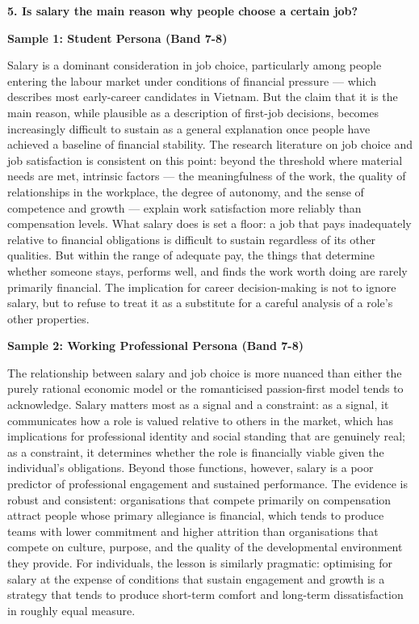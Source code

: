 \separator

\begin{ieltsquestion}
\textbf{5. Is salary the main reason why people choose a certain job?}
\end{ieltsquestion}
\textbf{Sample 1: Student Persona (Band 7-8)}

Salary is a dominant consideration in job choice, particularly among people entering the labour market under conditions of financial pressure — which describes most early-career candidates in Vietnam. But the claim that it is the main reason, while plausible as a description of first-job decisions, becomes increasingly difficult to sustain as a general explanation once people have achieved a baseline of financial stability. The research literature on job choice and job satisfaction is consistent on this point: beyond the threshold where material needs are met, intrinsic factors — the meaningfulness of the work, the quality of relationships in the workplace, the degree of autonomy, and the sense of competence and growth — explain work satisfaction more reliably than compensation levels. What salary does is set a floor: a job that pays inadequately relative to financial obligations is difficult to sustain regardless of its other qualities. But within the range of adequate pay, the things that determine whether someone stays, performs well, and finds the work worth doing are rarely primarily financial. The implication for career decision-making is not to ignore salary, but to refuse to treat it as a substitute for a careful analysis of a role's other properties.

\textbf{Sample 2: Working Professional Persona (Band 7-8)}

The relationship between salary and job choice is more nuanced than either the purely rational economic model or the romanticised passion-first model tends to acknowledge. Salary matters most as a signal and a constraint: as a signal, it communicates how a role is valued relative to others in the market, which has implications for professional identity and social standing that are genuinely real; as a constraint, it determines whether the role is financially viable given the individual's obligations. Beyond those functions, however, salary is a poor predictor of professional engagement and sustained performance. The evidence is robust and consistent: organisations that compete primarily on compensation attract people whose primary allegiance is financial, which tends to produce teams with lower commitment and higher attrition than organisations that compete on culture, purpose, and the quality of the developmental environment they provide. For individuals, the lesson is similarly pragmatic: optimising for salary at the expense of conditions that sustain engagement and growth is a strategy that tends to produce short-term comfort and long-term dissatisfaction in roughly equal measure.

